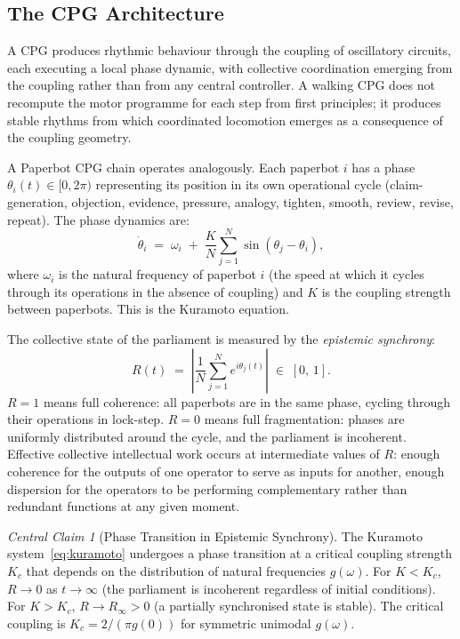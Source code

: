 \documentclass[12pt, letterpaper]{article}
\theoremstyle{remark}
\newtheorem*{claim}{Central Claim}
\begin{document}
\subsection{The CPG Architecture}

A CPG produces rhythmic behaviour through the coupling of oscillatory
circuits, each executing a local phase dynamic, with collective coordination
emerging from the coupling rather than from any central controller.  A
walking CPG does not recompute the motor programme for each step from first
principles; it produces stable rhythms from which coordinated locomotion
emerges as a consequence of the coupling geometry.

A Paperbot CPG chain operates analogously.  Each paperbot $i$ has a phase
$\theta_i(t) \in [0, 2\pi)$ representing its position in its own operational
cycle (claim-generation, objection, evidence, pressure, analogy, tighten,
smooth, review, revise, repeat).  The phase dynamics are:
\begin{equation}
  \dot{\theta}_i
  \;=\;
  \omega_i
  \;+\;
  \frac{K}{N}
  \sum_{j=1}^{N}
  \sin(\theta_j - \theta_i),
  \label{eq:kuramoto}
\end{equation}
where $\omega_i$ is the natural frequency of paperbot $i$ (the speed at which
it cycles through its operations in the absence of coupling) and $K$ is the
coupling strength between paperbots.  This is the Kuramoto equation.

The collective state of the parliament is measured by the \emph{epistemic
synchrony}:
\begin{equation}
  R(t)
  \;=\;
  \left|
  \frac{1}{N}
  \sum_{j=1}^{N}
  e^{i\theta_j(t)}
  \right|
  \;\in\;
  [0,\,1].
\end{equation}
$R = 1$ means full coherence: all paperbots are in the same phase, cycling
through their operations in lock-step.  $R = 0$ means full fragmentation:
phases are uniformly distributed around the cycle, and the parliament is
incoherent.  Effective collective intellectual work occurs at intermediate
values of $R$: enough coherence for the outputs of one operator to serve as
inputs for another, enough dispersion for the operators to be performing
complementary rather than redundant functions at any given moment.

\begin{claim}[Phase Transition in Epistemic Synchrony]
The Kuramoto system~\eqref{eq:kuramoto} undergoes a phase transition at
a critical coupling strength $K_c$ that depends on the distribution of
natural frequencies $g(\omega)$.  For $K < K_c$, $R \to 0$ as $t \to \infty$
(the parliament is incoherent regardless of initial conditions).  For
$K > K_c$, $R \to R_\infty > 0$ (a partially synchronised state is stable).
The critical coupling is $K_c = 2/(\pi g(0))$ for symmetric unimodal
$g(\omega)$.
\end{claim}
\end{document}
